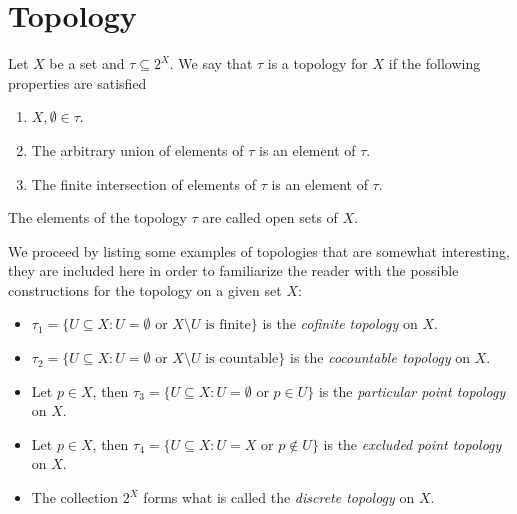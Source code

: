 \section{Topology}

\begin{definition}[Topology]\label{def:topology}
    Let \(X\) be a set and \(\tau \subseteq 2^X\). We say that \(\tau\)
    is a topology for \(X\) if the following properties are satisfied
    \begin{enumerate}[(T1)]\setlength\itemsep{0em}
        \item\label{item:topology-T1}
        \(X, \emptyset \in \tau\).

        \item\label{item:topology-T2}
        The arbitrary union of elements of \(\tau\) is an element of
        \(\tau\).

        \item\label{item:topology-T3}
        The finite intersection of elements of \(\tau\) is an element of
        \(\tau\).
    \end{enumerate}
    The elements of the topology \(\tau\) are called open sets of \(X\).
\end{definition}

\begin{example}\label{exp:some-topologies}
    We proceed by listing some examples of topologies that are somewhat interesting,
    they are included here in order to familiarize the reader with the possible
    constructions for the topology on a given set \(X\):
    \begin{itemize}\setlength\itemsep{0em}
        \item \(\tau_1 = \{U \subseteq X \colon U = \emptyset \text{ or
              } X \setminus U \text{ is finite}\}\) is the \emph{cofinite topology} on \(X\).

        \item \(\tau_2 = \{U \subseteq X \colon U = \emptyset \text{ or } X \setminus U
              \text{ is countable}\}\) is the \emph{cocountable topology} on \(X\).

        \item Let \(p \in X\), then \(\tau_3 = \{U \subseteq X \colon U = \emptyset
              \text{ or } p \in U\}\) is the \emph{particular point topology} on \(X\).

        \item Let \(p \in X\), then \(\tau_4 = \{U \subseteq X \colon U = X \text{ or }
              p \not\in U\}\) is the \emph{excluded point topology} on \(X\).
        \item The collection \(2^X\) forms what is called the \emph{discrete topology}
              on \(X\).
    \end{itemize}
\end{example}

